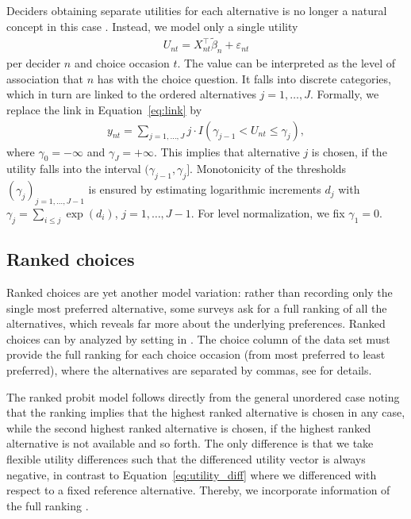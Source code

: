 \documentclass[article,shortnames]{jss}
\newcommand{\fct}[1]{\code{#1()}}
\begin{document}
Deciders obtaining separate utilities for each alternative is no longer a natural concept in this case \citep[Ch.\ 7.4]{Train:2009}. Instead, we model only a single utility
%
\begin{align*}
  U_{nt} = X_{nt}^\top \tilde{\beta}_n + \varepsilon_{nt}
\end{align*}
%
per decider $n$ and choice occasion $t$. The value can be interpreted as the level of association that $n$ has with the choice question. It falls into discrete categories, which in turn are linked to the ordered alternatives $j=1,\dots,J$. Formally, we replace the link in Equation~\ref{eq:link} by
%
\begin{align*}
   y_{nt} = \sum_{j = 1,\dots,J} j \cdot I(\gamma_{j-1} < U_{nt} \leq \gamma_{j}),
\end{align*}
%
where $\gamma_0 = -\infty$ and $\gamma_J = +\infty$. This implies that alternative $j$ is chosen, if the utility falls into the interval $(\gamma_{j-1}, \gamma_j]$. Monotonicity of the thresholds $(\gamma_j)_{j=1,\dots,J-1}$ is ensured by estimating logarithmic increments $d_j$ with $\gamma_j = \sum_{i\leq j} \exp{(d_i)}$, $j=1,\dots,J-1$. For level normalization, we fix $\gamma_1 = 0$.

\subsection{Ranked choices} \label{subsec:ranked_choices}

Ranked choices are yet another model variation: rather than recording only the single most preferred alternative, some surveys ask for a full ranking of all the alternatives, which reveals far more about the underlying preferences. Ranked choices can by analyzed by setting  in \fct{prepare\_data}. The choice column of the data set must provide the full ranking for each choice occasion (from most preferred to least preferred), where the alternatives are separated by commas, see  for details.

The ranked probit model follows directly from the general unordered case noting that the ranking implies that the highest ranked alternative is chosen in any case, while the second highest ranked alternative is chosen, if the highest ranked alternative is not available and so forth. The only difference is that we take flexible utility differences such that the differenced utility vector is always negative, in contrast to Equation~\ref{eq:utility_diff} where we differenced with respect to a fixed reference alternative. Thereby, we incorporate information of the full ranking \citep[Ch.\ 7.3]{Train:2009}.
\end{document}
